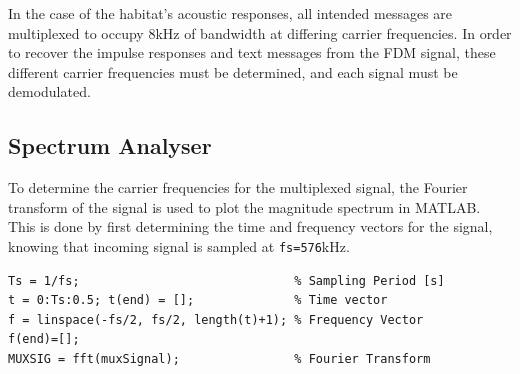 \documentclass[12pt]{article}
\begin{document}
\begin{center}
\end{center}

\noindent
In the case of the habitat's acoustic responses, all intended messages are
multiplexed to occupy 8kHz of bandwidth at differing carrier frequencies. In
order to recover the impulse responses and text messages from the FDM signal,
these different carrier frequencies must be determined, and each signal must be
demodulated.
\subsection*{Spectrum Analyser}
To determine the carrier frequencies for the multiplexed signal, the Fourier
transform of the signal is used to plot the magnitude spectrum in MATLAB. This
is done by first determining the time and frequency vectors for the signal,
knowing that incoming signal is sampled at \verb+fs=576+kHz.

\begin{verbatim}
Ts = 1/fs;                              % Sampling Period [s]
t = 0:Ts:0.5; t(end) = [];              % Time vector
f = linspace(-fs/2, fs/2, length(t)+1); % Frequency Vector
f(end)=[];  
MUXSIG = fft(muxSignal);                % Fourier Transform
\end{verbatim}
\end{document}
